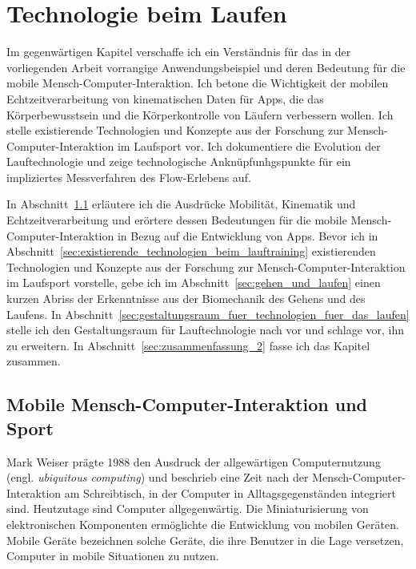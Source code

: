\chapter{Technologie beim Laufen}
\label{cha:technologie_beim_laufen}

Im gegenwärtigen Kapitel verschaffe ich ein Verständnis für das in der vorliegenden Arbeit vorrangige Anwendungsbeispiel und deren Bedeutung für die mobile Mensch-Computer-Interaktion. Ich betone die Wichtigkeit der mobilen Echtzeitverarbeitung von kinematischen Daten für Apps, die das Körperbewusstsein und die Körperkontrolle von Läufern verbessern wollen. Ich stelle existierende Technologien und Konzepte aus der Forschung zur Mensch-Computer-Interaktion im Laufsport vor. Ich dokumentiere die Evolution der Lauftechnologie und zeige technologische Anknüpfunhgspunkte für ein impliziertes Messverfahren des Flow-Erlebens auf.

In Abschnitt~\ref{sec:mensch_computer_interaktion_und_sport} erläutere ich die Ausdrücke Mobilität, Kinematik und Echtzeitverarbeitung und erörtere dessen Bedeutungen für die mobile Mensch-Computer-Interaktion in Bezug auf die Entwicklung von Apps. Bevor ich in Abschnitt~\ref{sec:existierende_technologien_beim_lauftraining} existierenden Technologien und Konzepte aus der Forschung zur Mensch-Computer-Interaktion im Laufsport vorstelle, gebe ich im Abschnitt~\ref{sec:gehen_und_laufen} einen kurzen Abriss der Erkenntnisse aus der Biomechanik des Gehens und des Laufens. In Abschnitt~\ref{sec:gestaltungsraum_fuer_technologien_fuer_das_laufen} stelle ich den Gestaltungsraum für Lauftechnologie nach \citet{Jensen2014} vor und schlage vor, ihn zu erweitern. In Abschnitt~\ref{sec:zusammenfassung_2} fasse ich das Kapitel zusammen.

\section{Mobile Mensch-Computer-Interaktion und Sport}
\label{sec:mensch_computer_interaktion_und_sport}

Mark Weiser prägte 1988 den Ausdruck der allgewärtigen Computernutzung (engl. \emph{ubiquitous computing}) und beschrieb eine Zeit nach der Mensch-Computer-Interaktion am Schreibtisch, in der Computer in Alltagsgegenständen integriert sind. Heutzutage sind Computer allgegenwärtig. Die Miniaturisierung von elektronischen Komponenten ermöglichte die Entwicklung von mobilen Geräten. Mobile Geräte bezeichnen solche Geräte, die ihre Benutzer in die Lage versetzen, Computer in mobile Situationen zu nutzen.

